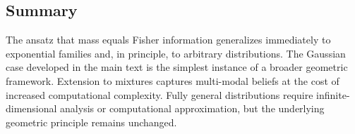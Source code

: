 \documentclass[12pt]{article}
\begin{document}
\subsection{Summary}

The ansatz that mass equals Fisher information generalizes immediately to exponential families and, in principle, to arbitrary distributions. The Gaussian case developed in the main text is the simplest instance of a broader geometric framework. Extension to mixtures captures multi-modal beliefs at the cost of increased computational complexity. Fully general distributions require infinite-dimensional analysis or computational approximation, but the underlying geometric principle remains unchanged.



\end{document}
